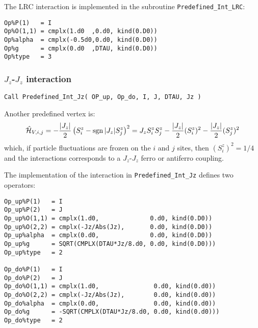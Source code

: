 The LRC interaction is implemented in the subroutine \texttt{Predefined\_Int\_LRC}:
\begin{lstlisting}[style=fortran]
Op%P(1)   = I
Op%O(1,1) = cmplx(1.d0  ,0.d0, kind(0.D0))
Op%alpha  = cmplx(-0.5d0,0.d0, kind(0.D0))
Op%g      = cmplx(0.d0  ,DTAU, kind(0.D0)) 
Op%type   = 3
\end{lstlisting}


\subsubsection{$J_z$-$J_z$ interaction}

\begin{lstlisting}[style=fortran]
Call Predefined_Int_Jz( OP_up, Op_do, I, J, DTAU, Jz )
\end{lstlisting}

Another predefined vertex is:
\begin{align}
\hat{\mathcal{H}}_{V,i,j} =
- \frac{|J_z|}{2}  \left( S^{z}_i - \operatorname{sgn}|J_z| S^{z}_j \right)^2 =
J_z  S^{z}_i  S^{z}_j  - \frac{|J_z|}{2} (S^{z}_i)^2 - \frac{|J_z|}{2}(S^{z}_j)^2 
\end{align} 
which, if particle fluctuations are frozen on the $i$ and $j$ sites, then $(S^{z}_i)^2 = 1/4$ and the interactions corresponds to a $J_z$-$J_z$ ferro or antiferro coupling.

The implementation of the interaction in \texttt{Predefined\_Int\_Jz} defines two operators:
\begin{lstlisting}[style=fortran]
Op_up%P(1)   = I
Op_up%P(2)   = J
Op_up%O(1,1) = cmplx(1.d0,              0.d0, kind(0.D0))
Op_up%O(2,2) = cmplx(-Jz/Abs(Jz),       0.d0, kind(0.D0))
Op_up%alpha  = cmplx(0.d0,              0.d0, kind(0.D0))
Op_up%g      = SQRT(CMPLX(DTAU*Jz/8.d0, 0.d0, kind(0.D0))) 
Op_up%type   = 2

Op_do%P(1)   = I
Op_do%P(2)   = J
Op_do%O(1,1) = cmplx(1.d0,               0.d0, kind(0.d0))
Op_do%O(2,2) = cmplx(-Jz/Abs(Jz),        0.d0, kind(0.d0))
Op_do%alpha  = cmplx(0.d0,               0.d0, kind(0.d0))
Op_do%g      = -SQRT(CMPLX(DTAU*Jz/8.d0, 0.d0, kind(0.d0))) 
Op_do%type   = 2

\end{lstlisting}
